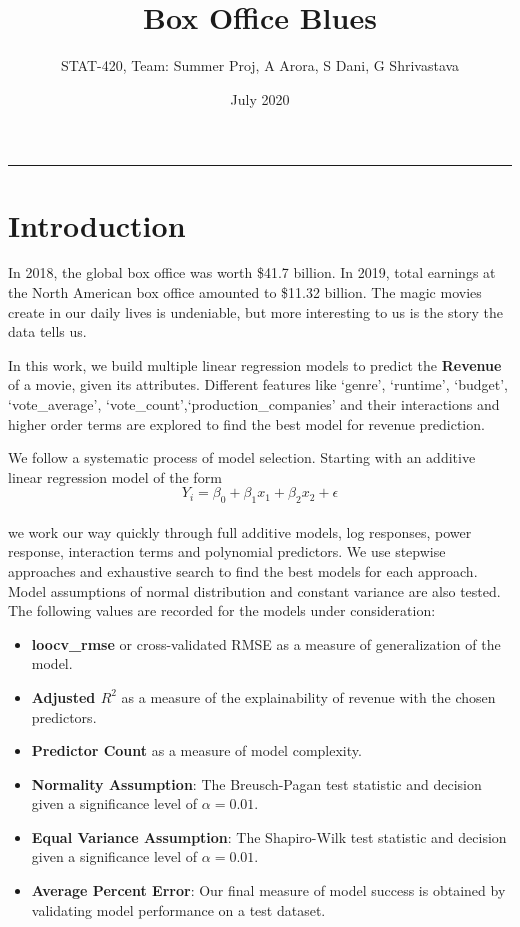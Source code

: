 \documentclass[
]{article}
\title{Box Office Blues}
\author{STAT-420, Team: Summer Proj, A Arora, S Dani, G Shrivastava}
\date{July 2020}
\providecommand{\tightlist}{%
  \setlength{\itemsep}{0pt}\setlength{\parskip}{0pt}}
\begin{document}
\maketitle

\begin{center}\rule{0.5\linewidth}{0.5pt}\end{center}

\hypertarget{introduction}{%
\section{Introduction}\label{introduction}}

In 2018, the global box office was worth \$41.7 billion. In 2019, total
earnings at the North American box office amounted to \$11.32 billion.
The magic movies create in our daily lives is undeniable, but more
interesting to us is the story the data tells us.

In this work, we build multiple linear regression models to predict the
\textbf{Revenue} of a movie, given its attributes. Different features
like `genre', `runtime', `budget', `vote\_average',
`vote\_count',`production\_companies' and their interactions and higher
order terms are explored to find the best model for revenue prediction.

We follow a systematic process of model selection. Starting with an
additive linear regression model of the form \[
Y_i = \beta_0 + \beta_1 x_{1} + \beta_2 x_{2} + \epsilon
\]\\
we work our way quickly through full additive models, log responses,
power response, interaction terms and polynomial predictors. We use
stepwise approaches and exhaustive search to find the best models for
each approach. Model assumptions of normal distribution and constant
variance are also tested. The following values are recorded for the
models under consideration:

\begin{itemize}
\tightlist
\item
  \textbf{loocv\_rmse} or cross-validated RMSE as a measure of
  generalization of the model.
\item
  \textbf{Adjusted \(R^2\)} as a measure of the explainability of
  revenue with the chosen predictors.
\item
  \textbf{Predictor Count} as a measure of model complexity.
\item
  \textbf{Normality Assumption}: The Breusch-Pagan test statistic and
  decision given a significance level of \(\alpha = 0.01\).
\item
  \textbf{Equal Variance Assumption}: The Shapiro-Wilk test statistic
  and decision given a significance level of \(\alpha = 0.01\).
\item
  \textbf{Average Percent Error}: Our final measure of model success is
  obtained by validating model performance on a test dataset.
\end{itemize}
\end{document}

